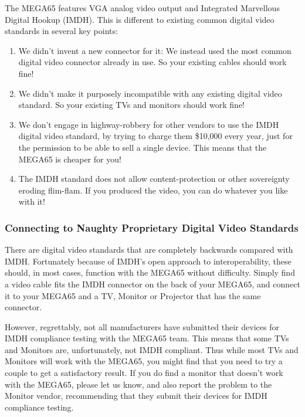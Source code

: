 The MEGA65 features VGA analog video output and Integrated Marvellous
Digital Hookup\texttrademark{} (IMDH\texttrademark{}). This is different
to existing common digital video standards in several key points:

\begin{enumerate}
  \item We didn't invent a new connector for it: We instead used the
    most common digital video connector already in use.  So your
    existing cables should work fine!
  \item We didn't make it purposely incompatible with any existing
    digital video standard. So your existing TVs and monitors should
    work fine!
  \item We don't engage in highway-robbery for other vendors to use
    the IMDH\texttrademark{} digital video standard, by trying to
    charge them \$10,000 every year, just for the permission to be
    able to sell a single device. This means that the MEGA65 is
    cheaper for you!
  \item The IMDH\texttrademark{} standard does not allow
    content-protection or other sovereignty eroding flim-flam. If you
    produced the video, you can do whatever you like with it!
\end{enumerate}

\subsubsection{Connecting to Naughty Proprietary Digital Video
  Standards}

There are digital video standards that are completely backwards compared
with IMDH\texttrademark. Fortunately because of IMDH\texttrademark's
open approach to interoperability, these should, in most cases,
function with the MEGA65 without difficulty.  Simply find a video
cable fits the IMDH\texttrademark{} connector on the back of your MEGA65, and connect
it to your MEGA65 and a TV, Monitor or Projector that has the same
connector.

However, regrettably, not all manufacturers
have submitted their devices for IMDH\texttrademark{} compliance testing with the
MEGA65 team. This means that some TVs and Monitors are,
unfortunately, not IMDH\texttrademark{} compliant.  Thus while most TVs and Monitors
will work with the MEGA65, you might find that you need to try a
couple to get a satisfactory result.  If you do find a monitor that
doesn't work with the MEGA65, please let us know, and also report the
problem to the Monitor vendor, recommending that they submit their
devices for IMDH\texttrademark{} compliance testing.

